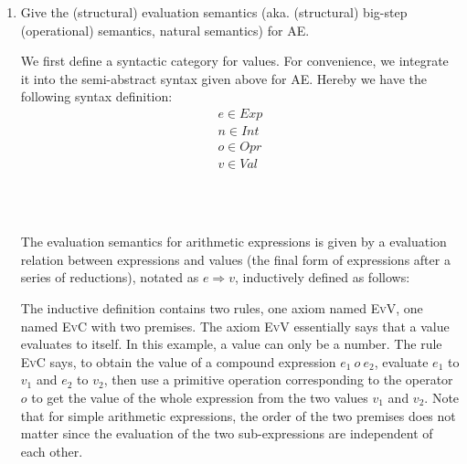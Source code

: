\documentclass[a4paper,12pt]{article}
\newcommand{\term}[1]{\textsf{#1}}
\newcommand{\appl}[2]{#1\inparens{#2}}
\newcommand{\eval}[2]{#1 \Longrightarrow #2}
\begin{document}
\begin{enumerate}
 \item Give the \term{(structural) evaluation semantics} (aka. \term{(structural)
  big-step (operational) semantics}, \term{natural semantics}) for AE.

  We first define a syntactic category for values.  For convenience, we integrate
  it into the semi-abstract syntax given above for AE.  Hereby we have the following
  syntax definition:
  \begin{gather*}
   e \in Exp \\
   n \in Int \\
   o \in Opr \\
   v \in Val
  \end{gather*}

  \begin{grammar}
   \\
   \\
  \end{grammar}
  
  The evaluation semantics for arithmetic expressions is given by a evaluation relation
  between expressions and values (the final form of expressions after a series of
  reductions), notated as $\eval{e}{v}$, inductively defined as follows:
  The inductive definition contains two rules, one axiom named \textsc{EvV}, one named
  \textsc{EvC} with two premises. The axiom \textsc{EvV} essentially says that a value
  evaluates to itself. In this example, a value can only be a number. The rule
  \textsc{EvC} says, to obtain the value of a compound expression $e_1\ o\ e_2$, evaluate
  $e_1$ to $v_1$ and $e_2$ to $v_2$, then use a primitive operation corresponding to the
  operator $o$ to get the value of the whole expression from the two values $v_1$ and $v_2$.
  Note that for simple arithmetic expressions, the order of the two premises does not
  matter since the evaluation of the two sub-expressions are independent of each other.


\end{enumerate}
\end{document}
